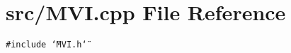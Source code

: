 \section{src/MVI.cpp File Reference}
\label{MVI_8cpp}
{\tt \#include \char`\"{}MVI.h\char`\"{}}\par
